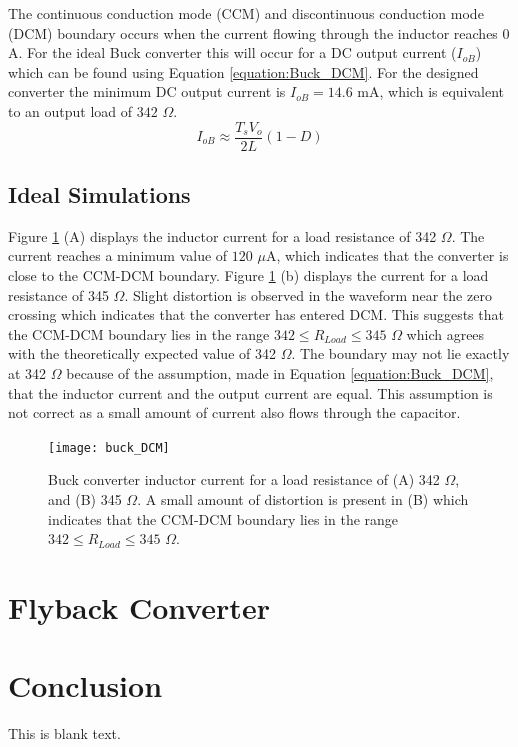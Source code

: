 \documentclass[12pt,twoside]{scrartcl}
\begin{document}
\vspace{5mm}
\noindent The continuous conduction mode (CCM) and discontinuous conduction mode (DCM) boundary occurs when the current flowing through the inductor reaches $0$ A. For the ideal Buck converter this will occur for a DC output current ($I_{oB}$) which can be found using Equation \ref{equation:Buck_DCM}. For the designed converter the minimum DC output current is $I_{oB} = 14.6$ mA, which is equivalent to an output load of $342$ $\Omega$.
\begin{equation}
I_{oB} \approx \frac{T_{s}V_{o}}{2L}(1-D) \label{equation:Buck_DCM}
\end{equation}
\pagebreak
\subsection{Ideal Simulations}
Figure \ref{fig:buck_DCM} (A) displays the inductor current for a load resistance of 342 $\Omega$. The current reaches a minimum value of $120 $ $\mu$A, which indicates that the converter is close to the CCM-DCM boundary. Figure \ref{fig:buck_DCM} (b) displays the current for a load resistance of 345 $\Omega$. Slight distortion is observed in the waveform near the zero crossing which indicates that the converter has entered DCM. This suggests that the CCM-DCM boundary lies in the range $342 \le R_{Load} \le 345$ $\Omega$ which agrees with the theoretically expected value of 342 $\Omega$. The boundary may not lie exactly at 342 $\Omega$ because of the assumption, made in Equation \ref{equation:Buck_DCM}, that the inductor current and the output current are equal. This assumption is not correct as a small amount of current also flows through the capacitor.

\begin{figure}[h]
    \centering
    \texttt{[image: buck\_DCM]}
    \caption{Buck converter inductor current for a load resistance of (A) 342 $\Omega$, and (B) 345 $\Omega$. A small amount of distortion is present in (B) which indicates that the CCM-DCM boundary lies in the range $342 \le R_{Load} \le 345$ $\Omega$.}
    \label{fig:buck_DCM}
\end{figure}

\newpage
\section{Flyback Converter}
\citep{BS412-EN}
\citep{jay1995write}
\newpage
\section{Conclusion}
This is blank text.
\newpage


\end{document}
